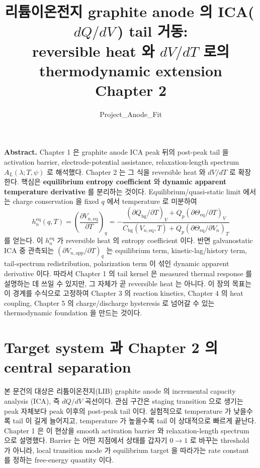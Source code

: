 \documentclass[11pt,a4paper]{article}
\title{\textbf{리튬이온전지 graphite anode 의 ICA(\,$dQ/dV$\,) tail 거동:\\
reversible heat 와 \(dV/dT\) 로의 thermodynamic extension}\\[0.4em]
\large Chapter 2}
\author{Project\_Anode\_Fit}
\date{}
\newcommand{\eqs}{\mathrm{eq}}
\newcommand{\app}{\mathrm{app}}
\newcommand{\bg}{\mathrm{bg}}
\begin{document}
\maketitle

\begin{center}\begin{minipage}{0.93\textwidth}
\small \textbf{Abstract.}
Chapter 1 은 graphite anode ICA peak 뒤의 post-peak tail 을 activation barrier,
electrode-potential assistance, relaxation-length spectrum \(A_L(\lambda;T,\psi)\) 로
해석했다. Chapter 2 는 그 식을 reversible heat 와 \(dV/dT\) 로 확장한다. 핵심은
\textbf{equilibrium entropy coefficient} 와 \textbf{dynamic apparent temperature derivative} 를
분리하는 것이다. Equilibrium/quasi-static limit 에서는 charge conservation 을 fixed \(q\) 에서
temperature 로 미분하여
\[
h_n^{\eqs}(q,T)
=
\left(\frac{\partial V_{n,\eqs}}{\partial T}\right)_q
=
-\frac{
\left(\partial Q_{\bg}/\partial T\right)_V
+Q_p\left(\partial\Theta_{\eqs}/\partial T\right)_V}
{C_{\bg}(V_{n,\eqs},T)+Q_p\left(\partial\Theta_{\eqs}/\partial V_n\right)_T}
\]
를 얻는다. 이 \(h_n^{\eqs}\) 가 reversible heat 의 entropy coefficient 이다. 반면
galvanostatic ICA 중 관측되는 \((\partial V_{n,\app}/\partial T)_q\) 는 equilibrium term,
kinetic-lag/history term, tail-spectrum redistribution, polarization term 이 섞인
dynamic apparent derivative 이다. 따라서 Chapter 1 의 tail kernel 은 measured thermal
response 를 설명하는 데 쓰일 수 있지만, 그 자체가 곧 reversible heat 는 아니다. 이 장의
목표는 이 경계를 수식으로 고정하여 Chapter 3 의 reaction kinetics, Chapter 4 의 heat coupling,
Chapter 5 의 charge/discharge hysteresis 로 넘어갈 수 있는 thermodynamic foundation 을 만드는 것이다.
\end{minipage}\end{center}

\tableofcontents
\newpage

\section{Target system 과 Chapter 2 의 central separation}\label{sec:target}

본 문건의 대상은 리튬이온전지(LIB) graphite anode 의 incremental capacity analysis (ICA),
즉 \(dQ/dV\) 곡선이다. 관심 구간은 staging transition 으로 생기는 peak 자체보다
peak 이후의 post-peak tail 이다. 실험적으로 temperature 가 낮을수록 tail 이 길게 늘어지고,
temperature 가 높을수록 tail 이 상대적으로 빠르게 끝난다. Chapter 1 은 이 현상을
smooth activation barrier 와 relaxation-length spectrum 으로 설명했다. Barrier 는 어떤 지점에서
상태를 갑자기 \(0\to1\) 로 바꾸는 threshold 가 아니라, local transition mode 가 equilibrium target 을
따라가는 rate constant 를 정하는 free-energy quantity 이다.
\end{document}
